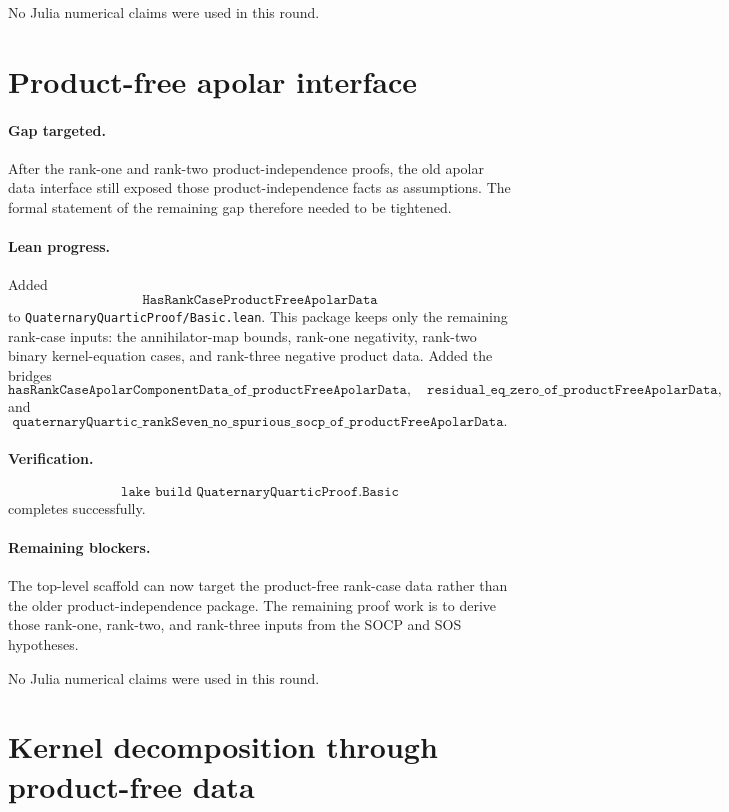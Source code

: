 \documentclass[11pt]{article}
\begin{document}
No Julia numerical claims were used in this round.

\section*{Product-free apolar interface}

\paragraph{Gap targeted.}
After the rank-one and rank-two product-independence proofs, the old apolar
data interface still exposed those product-independence facts as assumptions.
The formal statement of the remaining gap therefore needed to be tightened.

\paragraph{Lean progress.}
Added
\[
\texttt{HasRankCaseProductFreeApolarData}
\]
to \texttt{QuaternaryQuarticProof/Basic.lean}.  This package keeps only the
remaining rank-case inputs: the annihilator-map bounds, rank-one negativity,
rank-two binary kernel-equation cases, and rank-three negative product data.
Added the bridges
\[
\texttt{hasRankCaseApolarComponentData\_of\_productFreeApolarData},
\quad
\texttt{residual\_eq\_zero\_of\_productFreeApolarData},
\]
and
\[
\texttt{quaternaryQuartic\_rankSeven\_no\_spurious\_socp\_of\_productFreeApolarData}.
\]

\paragraph{Verification.}
\[
\texttt{lake build QuaternaryQuarticProof.Basic}
\]
completes successfully.

\paragraph{Remaining blockers.}
The top-level scaffold can now target the product-free rank-case data rather
than the older product-independence package.  The remaining proof work is to
derive those rank-one, rank-two, and rank-three inputs from the SOCP and SOS
hypotheses.

No Julia numerical claims were used in this round.

\section*{Kernel decomposition through product-free data}
\end{document}
